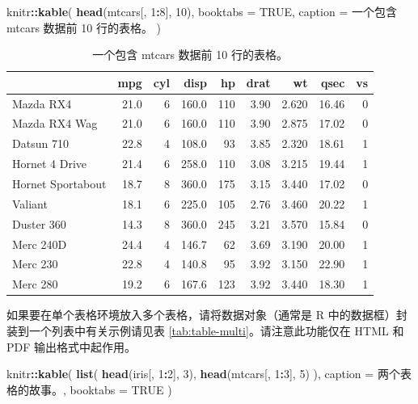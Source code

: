 \documentclass[
  12pt,
]{krantz}
\newenvironment{Shaded}{\begin{snugshade}}{\end{snugshade}}
\newcommand{\AttributeTok}[1]{\textcolor[rgb]{0.13,0.29,0.53}{#1}}
\newcommand{\ConstantTok}[1]{\textcolor[rgb]{0.56,0.35,0.01}{#1}}
\newcommand{\DecValTok}[1]{\textcolor[rgb]{0.00,0.00,0.81}{#1}}
\newcommand{\FunctionTok}[1]{\textcolor[rgb]{0.13,0.29,0.53}{\textbf{#1}}}
\newcommand{\NormalTok}[1]{#1}
\newcommand{\SpecialCharTok}[1]{\textcolor[rgb]{0.81,0.36,0.00}{\textbf{#1}}}
\newcommand{\StringTok}[1]{\textcolor[rgb]{0.31,0.60,0.02}{#1}}
\theoremstyle{definition}
\theoremstyle{definition}
\theoremstyle{definition}
\theoremstyle{definition}
\theoremstyle{remark}
\begin{document}
\begin{Shaded}
\begin{Highlighting}[]
\NormalTok{knitr}\SpecialCharTok{::}\FunctionTok{kable}\NormalTok{(}
  \FunctionTok{head}\NormalTok{(mtcars[, }\DecValTok{1}\SpecialCharTok{:}\DecValTok{8}\NormalTok{], }\DecValTok{10}\NormalTok{), }\AttributeTok{booktabs =} \ConstantTok{TRUE}\NormalTok{,}
  \AttributeTok{caption =} \StringTok{\textquotesingle{}一个包含 mtcars 数据前 10 行的表格。\textquotesingle{}}
\NormalTok{)}
\end{Highlighting}
\end{Shaded}

\begin{table}

\caption{\label{tab:table-single}一个包含 mtcars 数据前 10 行的表格。}
\centering
\begin{tabular}[t]{lrrrrrrrr}
\toprule
  & mpg & cyl & disp & hp & drat & wt & qsec & vs\\
\midrule
Mazda RX4 & 21.0 & 6 & 160.0 & 110 & 3.90 & 2.620 & 16.46 & 0\\
Mazda RX4 Wag & 21.0 & 6 & 160.0 & 110 & 3.90 & 2.875 & 17.02 & 0\\
Datsun 710 & 22.8 & 4 & 108.0 & 93 & 3.85 & 2.320 & 18.61 & 1\\
Hornet 4 Drive & 21.4 & 6 & 258.0 & 110 & 3.08 & 3.215 & 19.44 & 1\\
Hornet Sportabout & 18.7 & 8 & 360.0 & 175 & 3.15 & 3.440 & 17.02 & 0\\
\addlinespace
Valiant & 18.1 & 6 & 225.0 & 105 & 2.76 & 3.460 & 20.22 & 1\\
Duster 360 & 14.3 & 8 & 360.0 & 245 & 3.21 & 3.570 & 15.84 & 0\\
Merc 240D & 24.4 & 4 & 146.7 & 62 & 3.69 & 3.190 & 20.00 & 1\\
Merc 230 & 22.8 & 4 & 140.8 & 95 & 3.92 & 3.150 & 22.90 & 1\\
Merc 280 & 19.2 & 6 & 167.6 & 123 & 3.92 & 3.440 & 18.30 & 1\\
\bottomrule
\end{tabular}
\end{table}

如果要在单个表格环境放入多个表格，请将数据对象（通常是 R 中的数据框）封装到一个列表中有关示例请见表 \ref{tab:table-multi}。请注意此功能仅在 HTML 和 PDF 输出格式中起作用。

\begin{Shaded}
\begin{Highlighting}[]
\NormalTok{knitr}\SpecialCharTok{::}\FunctionTok{kable}\NormalTok{(}
  \FunctionTok{list}\NormalTok{(}
    \FunctionTok{head}\NormalTok{(iris[, }\DecValTok{1}\SpecialCharTok{:}\DecValTok{2}\NormalTok{], }\DecValTok{3}\NormalTok{),}
    \FunctionTok{head}\NormalTok{(mtcars[, }\DecValTok{1}\SpecialCharTok{:}\DecValTok{3}\NormalTok{], }\DecValTok{5}\NormalTok{)}
\NormalTok{  ),}
  \AttributeTok{caption =} \StringTok{\textquotesingle{}两个表格的故事。\textquotesingle{}}\NormalTok{, }\AttributeTok{booktabs =} \ConstantTok{TRUE}
\NormalTok{)}
\end{Highlighting}
\end{Shaded}
\end{document}
